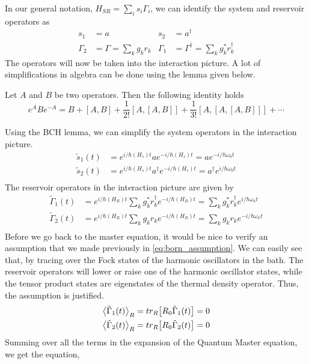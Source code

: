 \documentclass{scrartcl}
\newcommand{\1}{\mathbbm{1}}
\newcommand{\G}{\Gamma}
\newcommand{\iG}{\tilde{\Gamma}}
\newcommand{\is}{\tilde{s}}
\begin{document}
In our general notation, \(H_{SR} = \sum_i s_i \G_i\), we can identify the system and reservoir operators as 
\begin{align}
    s_1 &= a & s_2 &= a^\dagger \\ \G_2 &= \G =  \sum_k g_k r_k & \G_1 &= \G^\dagger= \sum_k g_k^* r_k^\dagger
\end{align}
The operators will now be taken into the interaction picture. A lot of simplifications in algebra 
can be done using the lemma given below.
\begin{lemma}
    Let \(A\) and \(B\) be two operators. Then the following identity holds
    \[ e^A B e^{-A} = B + [A,B] + \frac{1}{2!} [A,[A,B]] + \frac{1}{3!} [A,[A,[A,B]]] + \cdots \]
\end{lemma}
Using the BCH lemma, we can simplify the system operators in the interaction picture.
\begin{align*}
    \is_1(t) &= e^{i\slash \hbar (H_s)t} a e^{-i\slash \hbar (H_s)t} = a e^{-i\slash \hbar \omega_0 t} \\
    \is_2(t) &= e^{i\slash \hbar (H_s)t} a^\dagger e^{-i\slash \hbar (H_s)t} = a^\dagger e^{i\slash \hbar \omega_0 t} \\
\end{align*}
The reservoir operators in the interaction picture are given by
\begin{align*}
    \iG_1(t) &= e^{i\slash \hbar (H_R)t} \sum_k g_k^* r_k^\dagger e^{-i\slash \hbar (H_R)t} = \sum_k g_k^* r_k^\dagger e^{i\slash \hbar \omega_k t} \\
    \iG_2(t) &= e^{i\slash \hbar (H_R)t} \sum_k g_k r_k e^{-i\slash \hbar (H_R)t} = \sum_k g_k r_k e^{-i\slash \hbar \omega_k t} \\
\end{align*}
Before we go back to the master equation, it would be nice to verify an assumption that we made previously
in \cref{eq:born_assumption}. We can easily see that, by tracing over the Fock states of the harmonic oscillators in the bath.
The reservoir operators will lower or raise one  of the harmonic oscillator states, while the tensor product states are eigenstates of the
thermal density operator. Thus, the assumption is justified.
\begin{align*}
    \expval{\iG_1(t)}_R &= tr_R\qty[R_0 \iG_1(t)] = 0 \\
    \expval{\iG_2(t)}_R &= tr_R\qty[R_0 \iG_2(t)] = 0
\end{align*}
Summing over all the terms in the expansion of the Quantum Master equation, we get the equation,
\end{document}
